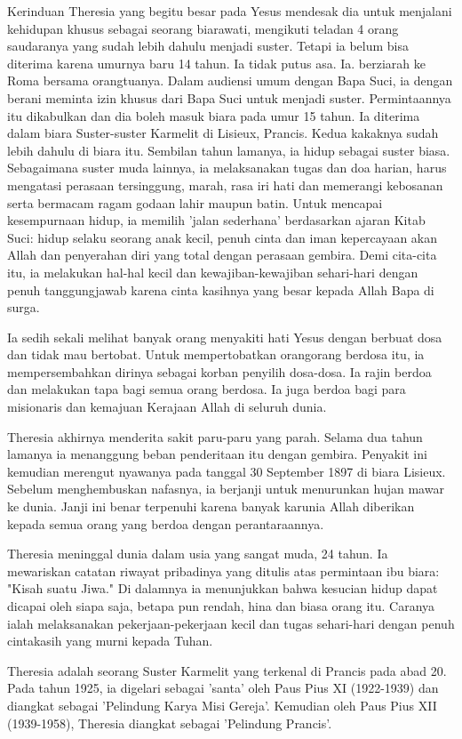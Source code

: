 \documentclass[12pt]{scrartcl}
\begin{document}
Kerinduan Theresia yang begitu besar pada Yesus mendesak dia untuk menjalani kehidupan khusus sebagai seorang biarawati, mengikuti teladan 4 orang saudaranya yang sudah lebih dahulu menjadi suster. Tetapi ia belum bisa diterima karena umurnya baru 14 tahun. Ia tidak putus asa. Ia. berziarah ke Roma bersama orangtuanya. Dalam audiensi umum dengan Bapa Suci, ia dengan berani meminta izin khusus dari Bapa Suci untuk menjadi suster. Permintaannya itu dikabulkan dan dia boleh masuk biara pada umur 15 tahun. Ia diterima dalam biara Suster-suster Karmelit di Lisieux, Prancis. Kedua kakaknya sudah lebih dahulu di biara itu. Sembilan tahun lamanya, ia hidup sebagai suster biasa. Sebagaimana suster muda lainnya, ia melaksanakan tugas dan doa harian, harus mengatasi perasaan tersinggung, marah, rasa iri hati dan memerangi kebosanan serta bermacam ragam godaan lahir maupun batin. Untuk mencapai kesempurnaan hidup, ia memilih 'jalan sederhana' berdasarkan ajaran Kitab Suci: hidup selaku seorang anak kecil, penuh cinta dan iman kepercayaan akan Allah dan penyerahan diri yang total dengan perasaan gembira. Demi cita-cita itu, ia melakukan hal-hal kecil dan kewajiban-kewajiban sehari-hari dengan penuh tanggungjawab karena cinta kasihnya yang besar kepada Allah Bapa di surga.

Ia sedih sekali melihat banyak orang menyakiti hati Yesus dengan berbuat dosa dan tidak mau bertobat. Untuk mempertobatkan orangorang berdosa itu, ia mempersembahkan dirinya sebagai korban penyilih dosa-dosa. Ia rajin berdoa dan melakukan tapa bagi semua orang berdosa. Ia juga berdoa bagi para misionaris dan kemajuan Kerajaan Allah di seluruh dunia.

Theresia akhirnya menderita sakit paru-paru yang parah. Selama dua tahun lamanya ia menanggung beban penderitaan itu dengan gembira. Penyakit ini kemudian merengut nyawanya pada tanggal 30 September 1897 di biara Lisieux. Sebelum menghembuskan nafasnya, ia berjanji untuk menurunkan hujan mawar ke dunia. Janji ini benar terpenuhi karena banyak karunia Allah diberikan kepada semua orang yang berdoa dengan perantaraannya.

Theresia meninggal dunia dalam usia yang sangat muda, 24 tahun. Ia mewariskan catatan riwayat pribadinya yang ditulis atas permintaan ibu biara: "Kisah suatu Jiwa." Di dalamnya ia menunjukkan bahwa kesucian hidup dapat dicapai oleh siapa saja, betapa pun rendah, hina dan biasa orang itu. Caranya ialah melaksanakan pekerjaan-pekerjaan kecil dan tugas sehari-hari dengan penuh cintakasih yang murni kepada Tuhan.

Theresia adalah seorang Suster Karmelit yang terkenal di Prancis pada abad 20. Pada tahun 1925, ia digelari sebagai 'santa' oleh Paus Pius XI (1922-1939) dan diangkat sebagai 'Pelindung Karya Misi Gereja'. Kemudian oleh Paus Pius XII (1939-1958), Theresia diangkat sebagai 'Pelindung Prancis'.
\end{document}

